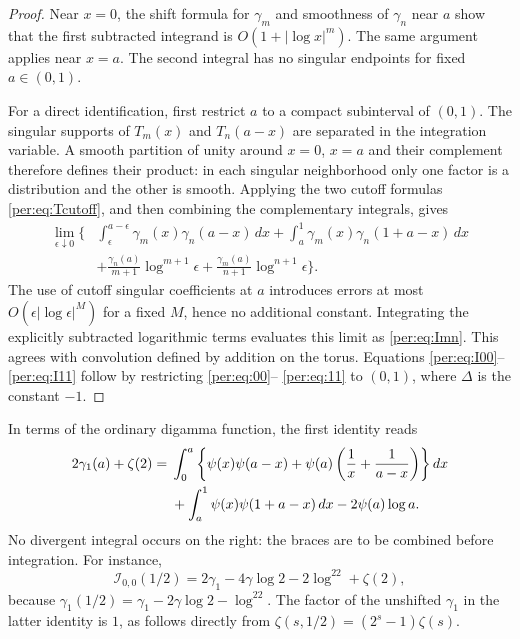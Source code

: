 \documentclass[11pt,letterpaper]{article}
\numberwithin{equation}{section}
\theoremstyle{plain}
\theoremstyle{definition}
\theoremstyle{remark}
\begin{document}
\begin{proof}
Near $x=0$, the shift formula for $\gamma_m$ and smoothness of
$\gamma_n$ near $a$ show that the first subtracted integrand is
$O(1+|\log x|^m)$. The same argument applies near $x=a$. The second
integral has no singular endpoints for fixed $a\in(0,1)$.

For a direct identification, first restrict $a$ to a compact subinterval
of $(0,1)$. The singular supports of $T_m(x)$ and $T_n(a-x)$ are
separated in the integration variable. A smooth partition of unity
around $x=0$, $x=a$ and their complement therefore defines their
product: in each singular neighborhood only one factor is a
distribution and the other is smooth. Applying the two cutoff formulas
\eqref{per:eq:Tcutoff}, and then combining the complementary integrals,
gives
\begin{align*}
 \lim_{\epsilon\downarrow0}\biggl\{&
 \int_\epsilon^{a-\epsilon}\gamma_m(x)\gamma_n(a-x)\,dx
 +\int_a^1\gamma_m(x)\gamma_n(1+a-x)\,dx\\
 &+\frac{\gamma_n(a)}{m+1}\log^{m+1}\epsilon
  +\frac{\gamma_m(a)}{n+1}\log^{n+1}\epsilon\biggr\}.
\end{align*}
The use of cutoff singular coefficients at $a$ introduces errors at most
$O(\epsilon|\log\epsilon|^M)$ for a fixed $M$, hence no additional
constant. Integrating the explicitly subtracted logarithmic terms
evaluates this limit as \eqref{per:eq:Imn}. This agrees with convolution
defined by addition on the torus. Equations \eqref{per:eq:I00}--
\eqref{per:eq:I11} follow by restricting \eqref{per:eq:00}--
\eqref{per:eq:11} to $(0,1)$, where $\Delta$ is the constant $-1$.
\end{proof}

In terms of the ordinary digamma function, the first identity reads
\begin{align}
 2\gamma_1(a)+\zeta(2)={}&
 \int_0^a\left\{\psi(x)\psi(a-x)
       +\psi(a)\left(\frac1x+\frac1{a-x}\right)\right\}dx\notag\\
 &+\int_a^1\psi(x)\psi(1+a-x)\,dx-2\psi(a)\log a.
 \label{per:eq:digammaintegral}
\end{align}
No divergent integral occurs on the right: the braces are to be combined
before integration. For instance,
\[
 \mathcal I_{0,0}(1/2)
 =2\gamma_1-4\gamma\log2-2\log^22+\zeta(2),
\]
because $\gamma_1(1/2)=\gamma_1-2\gamma\log2-\log^22$.
The factor of the unshifted $\gamma_1$ in the latter identity is $1$,
as follows directly from $\zeta(s,1/2)=(2^s-1)\zeta(s)$.
\end{document}
